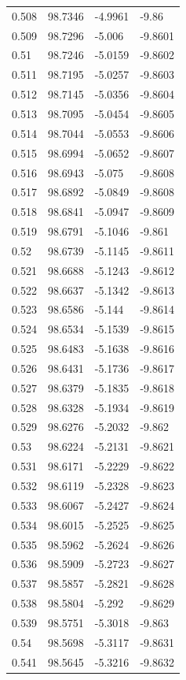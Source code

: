 \begin{tabular}{llll}
0.508 & 98.7346 & -4.9961 & -9.86 \\
0.509 & 98.7296 & -5.006 & -9.8601 \\
0.51 & 98.7246 & -5.0159 & -9.8602 \\
0.511 & 98.7195 & -5.0257 & -9.8603 \\
0.512 & 98.7145 & -5.0356 & -9.8604 \\
0.513 & 98.7095 & -5.0454 & -9.8605 \\
0.514 & 98.7044 & -5.0553 & -9.8606 \\
0.515 & 98.6994 & -5.0652 & -9.8607 \\
0.516 & 98.6943 & -5.075 & -9.8608 \\
0.517 & 98.6892 & -5.0849 & -9.8608 \\
0.518 & 98.6841 & -5.0947 & -9.8609 \\
0.519 & 98.6791 & -5.1046 & -9.861 \\
0.52 & 98.6739 & -5.1145 & -9.8611 \\
0.521 & 98.6688 & -5.1243 & -9.8612 \\
0.522 & 98.6637 & -5.1342 & -9.8613 \\
0.523 & 98.6586 & -5.144 & -9.8614 \\
0.524 & 98.6534 & -5.1539 & -9.8615 \\
0.525 & 98.6483 & -5.1638 & -9.8616 \\
0.526 & 98.6431 & -5.1736 & -9.8617 \\
0.527 & 98.6379 & -5.1835 & -9.8618 \\
0.528 & 98.6328 & -5.1934 & -9.8619 \\
0.529 & 98.6276 & -5.2032 & -9.862 \\
0.53 & 98.6224 & -5.2131 & -9.8621 \\
0.531 & 98.6171 & -5.2229 & -9.8622 \\
0.532 & 98.6119 & -5.2328 & -9.8623 \\
0.533 & 98.6067 & -5.2427 & -9.8624 \\
0.534 & 98.6015 & -5.2525 & -9.8625 \\
0.535 & 98.5962 & -5.2624 & -9.8626 \\
0.536 & 98.5909 & -5.2723 & -9.8627 \\
0.537 & 98.5857 & -5.2821 & -9.8628 \\
0.538 & 98.5804 & -5.292 & -9.8629 \\
0.539 & 98.5751 & -5.3018 & -9.863 \\
0.54 & 98.5698 & -5.3117 & -9.8631 \\
0.541 & 98.5645 & -5.3216 & -9.8632 \\

\end{tabular}
